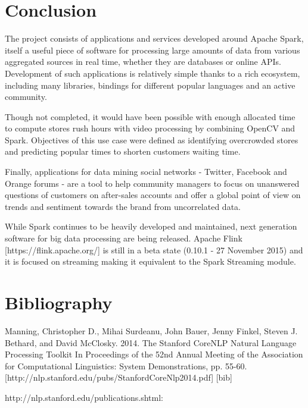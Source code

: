 \documentclass[11pt]{article}
\begin{document}
\section{Conclusion}

The project consists of applications and services developed around \textsf{Apache Spark}, itself a useful piece of software for processing large amounts of data from various aggregated sources in real time, whether they are databases or online APIs. Development of such applications is relatively simple thanks to a rich ecosystem, including many libraries, bindings for different popular languages and an active community.

Though not completed, it would have been possible with enough allocated time to compute stores rush hours with video processing by combining \textsf{OpenCV} and \textsf{Spark}. Objectives of this use case were defined as identifying overcrowded stores and predicting popular times to shorten customers waiting time.

Finally, applications for data mining social networks - \textsf{Twitter}, \textsf{Facebook} and \textsf{Orange} forums - are a tool to help community managers to focus on unanswered questions of customers on after-sales accounts and offer a global point of view on trends and sentiment towards the brand from uncorrelated data.

While \textsf{Spark} continues to be heavily developed and maintained, next generation software for big data processing are being released. \textsf{Apache Flink} [https://flink.apache.org/] is still in a beta state (0.10.1 - 27 November 2015) and it is focused on streaming making it equivalent to the \textsf{Spark Streaming} module.

\section{Bibliography}




Manning, Christopher D., Mihai Surdeanu, John Bauer, Jenny Finkel, Steven J. Bethard, and David McClosky. 2014. The Stanford CoreNLP Natural Language Processing Toolkit In Proceedings of the 52nd Annual Meeting of the Association for Computational Linguistics: System Demonstrations, pp. 55-60. [http://nlp.stanford.edu/pubs/StanfordCoreNlp2014.pdf] [bib]

http://nlp.stanford.edu/publications.shtml:
\end{document}
